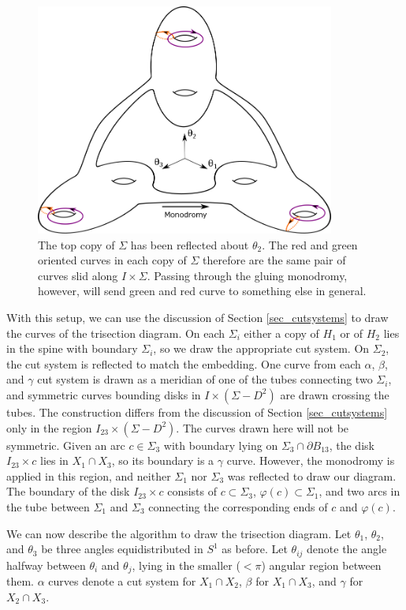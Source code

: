 \documentclass[12pt]{amsart}
\newcommand{\del}{\partial }
\theoremstyle{definition}
\theoremstyle{remark}
\begin{document}
\begin{figure}[h]
\centering
\includegraphics[height=3in]{sigmas.png}
\caption{  The top copy of $\Sigma$ has been reflected about $\theta_2$.
The red and green oriented curves in each copy of $\Sigma$ therefore are the same pair of curves slid along $I \times \Sigma$.
Passing through the gluing monodromy, however, will send green and red curve to something else in general.}
\label{embeddingsigmas}
\end{figure}

With this setup, we can use the discussion of Section \ref{sec_cutsystems} to draw the curves of the trisection diagram.
On each $\Sigma_i$ either a copy of $H_1$ or of $H_2$ lies in the spine with boundary $\Sigma_i$, so we draw the appropriate cut system.
On $\Sigma_2$, the cut system is reflected to match the embedding.
One curve from each $\alpha$, $\beta$, and $\gamma$ cut system is drawn as a meridian of one of the tubes connecting two $\Sigma_i$, and symmetric curves bounding disks in $I \times (\Sigma - D^2)$ are drawn crossing the tubes.
The construction differs from the discussion of Section \ref{sec_cutsystems} only in the region $I_{23} \times (\Sigma - D^2)$.
The curves drawn here will not be symmetric.
Given an arc $c \in \Sigma_3$ with boundary lying on $\Sigma_3 \cap \del B_{13}$, the disk $I_{23} \times c$ lies in $X_1 \cap X_3$, so its boundary is a $\gamma$ curve.
However, the monodromy is applied in this region, and neither $\Sigma_1$ nor $\Sigma_3$ was reflected to draw our diagram.
The boundary of the disk $I_{23} \times c$ consists of $c \subset \Sigma_3$, $\varphi(c) \subset \Sigma_1$, and two arcs in the tube between $\Sigma_1$ and $\Sigma_3$ connecting the corresponding ends of $c$ and $\varphi(c)$.


We can now describe the algorithm to draw the trisection diagram.
Let $\theta_1$, $\theta_2$, and $\theta_3$ be three angles equidistributed in $S^1$ as before.
Let $\theta_{ij}$ denote the angle halfway between $\theta_i$ and $\theta_j$, lying in the smaller ($<\pi$) angular region between them.
$\alpha$ curves denote a cut system for $X_1 \cap X_2$, $\beta$ for $X_1 \cap X_3$, and $\gamma$ for $X_2 \cap X_3$.
\end{document}
